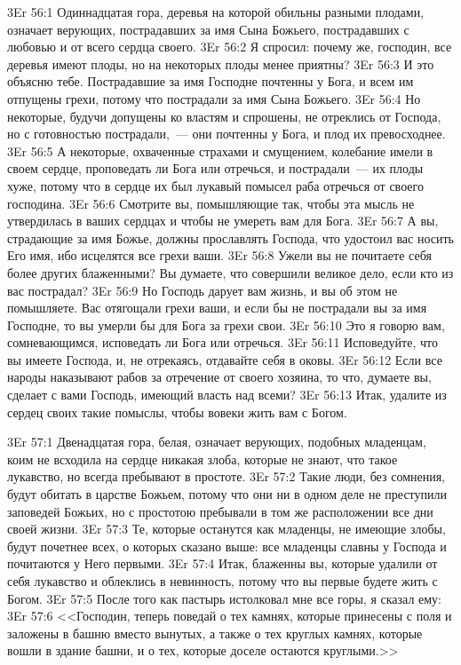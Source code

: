 \vs 3Er 56:1
Одиннадцатая гора, деревья
на которой обильны разными плодами, означает верующих, пострадавших за имя
Сына Божьего, пострадавших с любовью и от всего сердца своего.
\vs 3Er 56:2
Я спросил: почему же,
господин, все деревья имеют плоды, но на некоторых плоды менее приятны?
\vs 3Er 56:3
И это объясню тебе.
Пострадавшие за имя Господне почтенны у Бога, и всем им отпущены грехи, потому
что пострадали за имя Сына Божьего.
\vs 3Er 56:4
Но некоторые, будучи
допущены ко властям и спрошены, не отреклись от Господа, но с готовностью
пострадали,~--- они почтенны у Бога, и плод их превосходнее.
\vs 3Er 56:5
А некоторые, охваченные
страхами и смущением, колебание имели в своем сердце, проповедать ли Бога или
отречься, и пострадали~--- их плоды хуже, потому что в сердце их был лукавый
помысел раба отречься от своего господина.
\vs 3Er 56:6
Смотрите вы, помышляющие
так, чтобы эта мысль не утвердилась в ваших сердцах и чтобы не умереть вам для
Бога.
\vs 3Er 56:7
А вы, страдающие за имя
Божье, должны прославлять Господа, что удостоил вас носить Его имя, ибо
исцелятся все грехи ваши.
\vs 3Er 56:8
Ужели вы не почитаете себя
более других блаженными? Вы думаете, что совершили великое дело, если кто из
вас пострадал?
\vs 3Er 56:9
Но Господь дарует вам
жизнь, и вы об этом не помышляете. Вас отягощали грехи ваши, и если бы не
пострадали вы за имя Господне, то вы умерли бы для Бога за грехи свои.
\vs 3Er 56:10
Это я говорю вам,
сомневающимся, исповедать ли Бога или отречься.
\vs 3Er 56:11
Исповедуйте, что вы
имеете Господа, и, не отрекаясь, отдавайте себя в оковы.
\vs 3Er 56:12
Если все народы
наказывают рабов за отречение от своего хозяина, то что, думаете вы, сделает с
вами Господь, имеющий власть над всеми?
\vs 3Er 56:13
Итак, удалите из сердец
своих такие помыслы, чтобы вовеки жить вам с Богом.

\vs 3Er 57:1
Двенадцатая гора, белая,
означает верующих, подобных младенцам, коим не всходила на сердце никакая
злоба, которые не знают, что такое лукавство, но всегда пребывают в простоте.
\vs 3Er 57:2
Такие люди, без сомнения,
будут обитать в царстве Божьем, потому что они ни в одном деле не преступили
заповедей Божьих, но с простотою пребывали в том же расположении все дни своей
жизни.
\vs 3Er 57:3
Те, которые останутся как
младенцы, не имеющие злобы, будут почетнее всех, о которых сказано выше: все
младенцы славны у Господа и почитаются у Него первыми.
\vs 3Er 57:4
Итак, блаженны вы, которые
удалили от себя лукавство и облеклись в невинность, потому что вы первые
будете жить с Богом.
\vs 3Er 57:5
После того как пастырь
истолковал мне все горы, я сказал ему:
\vs 3Er 57:6
<<Господин, теперь поведай о тех камнях, которые принесены с поля и заложены в
башню вместо вынутых, а также о тех круглых камнях, которые вошли в здание
башни, и о тех, которые доселе остаются круглыми.>>

